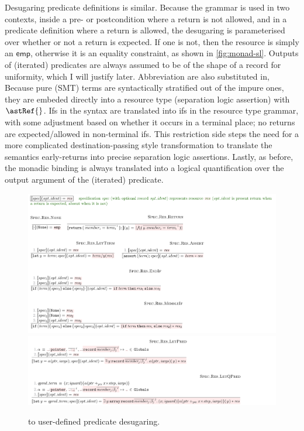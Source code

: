 Desugaring predicate definitions is similar. Because the grammar is used in two
contexts, inside a pre- or postcondition where a return is not allowed, and in
a predicate definition where a return is allowed, the desugaring is
parameterised over whether or not a return is expected. If one is not, then the
resource is simply an $\mathsf{emp}$, otherwise it is an equality constraint,
as shown in \cref{fig:monad-sl}. Outputs of (iterated) predicates are always
assumed to be of the shape of a record for uniformity, which I will justify
later. Abbreviation are also substituted in,
Because pure (SMT) terms are syntactically stratified out of
the impure ones, they are embeded directly into a resource type (separation
logic assertion) with $\astRef{}$. Ifs in the syntax are translated into ifs in
the resource type grammar, with some adjustment based on whether it occurs in a
terminal place; no returns are expected/allowed in non-terminal
ifs. This restriction side steps the need for a more complicated
destination-passing style  transformation to
translate the semantics early-returns into precise separation logic
assertions. Lastly, as before, the monadic binding  is %
always translated into a logical quantification over the output argument of the
(iterated) predicate.

\begin{figure}[tp]
    \includegraphics{figures/predicate-to-kernel-1}
    \includegraphics{figures/predicate-to-kernel-2}
    \caption{ to  user-defined predicate desugaring.}\label{fig:pred-to-kernel}
\end{figure}

